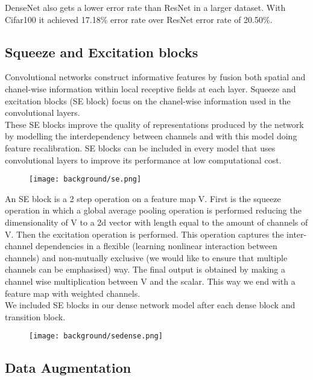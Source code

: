 DenseNet also gets a lower error rate than ResNet in a larger dataset. With Cifar100 it achieved 17.18\% error rate over ResNet error rate of 20.50\%.

\subsection{Squeeze and Excitation blocks}

Convolutional networks construct informative features by fusion both spatial and chanel-wise information within local receptive fields at each layer. Squeeze and excitation blocks (SE block) \cite{senet} focus on the chanel-wise information used in the convolutional layers. \\

These SE blocks improve the quality of representations produced by the network by modelling the interdependency between channels and with this model doing feature recalibration. SE blocks can be included in every model that uses convolutional layers to improve its performance at low computational cost.

\begin{figure}[H]
    \centering
    \texttt{[image: background/se.png]}
    \caption{}
    \label{figure:background:se}
\end{figure}

An SE block is a 2 step operation on a feature map V. First is the squeeze operation in which a global average pooling operation is performed reducing the dimensionality of V to a 2d vector with length equal to the amount of channels of V. Then the excitation operation is performed. This operation captures the inter-channel dependencies in a flexible (learning nonlinear interaction between channels) and non-mutually exclusive (we would like to ensure that multiple channels can be emphasised) way. The final output is obtained by making a channel wise multiplication between V and the scalar. This way we end with a feature map with weighted channels. \\

We included SE blocks in our dense network model after each dense block and transition block.

\begin{figure}[H]
    \centering
    \texttt{[image: background/sedense.png]}
    \caption{}
    \label{figure:background:se}
\end{figure}

\subsection{Data Augmentation}

